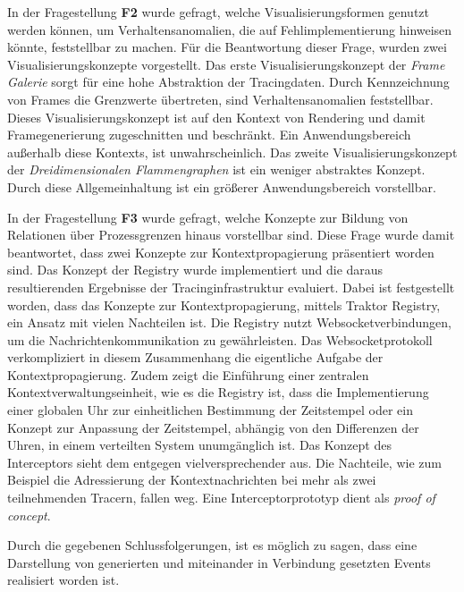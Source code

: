In der Fragestellung \textbf{F2} wurde gefragt, welche Visualisierungsformen genutzt werden können, um Verhaltensanomalien, die auf Fehlimplementierung hinweisen könnte, feststellbar zu machen. Für die Beantwortung dieser Frage, wurden zwei Visualisierungskonzepte vorgestellt. Das erste Visualisierungskonzept der \emph{Frame Galerie} sorgt für eine hohe Abstraktion der Tracingdaten. Durch Kennzeichnung von Frames die Grenzwerte übertreten, sind Verhaltensanomalien feststellbar. Dieses Visualisierungskonzept ist auf den Kontext von Rendering und damit Framegenerierung zugeschnitten und beschränkt. Ein Anwendungsbereich außerhalb diese Kontexts, ist unwahrscheinlich. Das zweite Visualisierungskonzept der \emph{Dreidimensionalen Flammengraphen} ist ein weniger abstraktes Konzept. Durch diese Allgemeinhaltung ist ein größerer Anwendungsbereich vorstellbar.

In der Fragestellung \textbf{F3} wurde gefragt, welche Konzepte zur Bildung von Relationen über Prozessgrenzen hinaus vorstellbar sind. Diese Frage wurde damit beantwortet, dass zwei Konzepte zur Kontextpropagierung präsentiert worden sind. Das Konzept der Registry wurde implementiert und die daraus resultierenden Ergebnisse der Tracinginfrastruktur evaluiert.	Dabei ist festgestellt worden, dass das Konzepte zur Kontextpropagierung, mittels Traktor Registry, ein Ansatz mit vielen Nachteilen ist. Die Registry nutzt Websocketverbindungen, um die Nachrichtenkommunikation zu gewährleisten. Das Websocketprotokoll verkompliziert in diesem Zusammenhang die eigentliche Aufgabe der Kontextpropagierung. Zudem zeigt die Einführung einer zentralen Kontextverwaltungseinheit, wie es die Registry ist, dass die Implementierung einer globalen Uhr zur einheitlichen Bestimmung der Zeitstempel oder ein Konzept zur Anpassung der Zeitstempel, abhängig von den Differenzen der Uhren, in einem verteilten System unumgänglich ist. Das Konzept des Interceptors sieht dem entgegen vielversprechender aus. Die Nachteile, wie zum Beispiel die Adressierung der Kontextnachrichten bei mehr als zwei teilnehmenden Tracern, fallen weg. Eine Interceptorprototyp dient als \emph{proof of concept}.

Durch die gegebenen Schlussfolgerungen, ist es möglich zu sagen, dass eine Darstellung von generierten und miteinander in Verbindung gesetzten Events realisiert worden ist.

